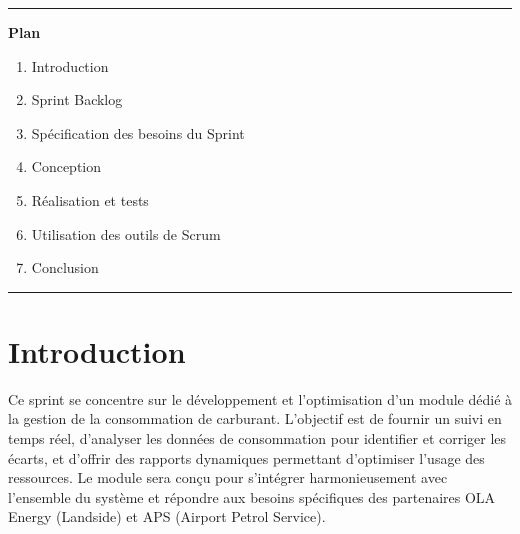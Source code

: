 \documentclass[a4paper,11pt]{report}
\begin{document}
\vspace{1.5cm}
\begin{center}
  \color{blue!60!black}\rule{0.6\textwidth}{1pt}
\end{center}
\vspace{1.5cm}

\begin{center}
  {\huge\bfseries Plan}\\[0.5em]
\end{center}
\vspace{1em}

\begin{enumerate}[%
  label=\bfseries\Large\arabic*., 
  leftmargin=2cm, 
  itemsep=1em
]
   \item Introduction
  \item Sprint Backlog
  \item Spécification des besoins du Sprint
  \item Conception
  \item Réalisation et tests
  \item Utilisation des outils de Scrum
  \item Conclusion
\end{enumerate}

\vfill
\begin{center}
  \color{blue!60!black}\rule{0.6\textwidth}{0.8pt}
\end{center}

\newpage
\setcounter{section}{0}

\section{Introduction}

Ce sprint se concentre sur le développement et l’optimisation d’un module dédié à la gestion de la consommation de carburant. L’objectif est de fournir un suivi en temps réel, d’analyser les données de consommation pour identifier et corriger les écarts, et d’offrir des rapports dynamiques permettant d’optimiser l’usage des ressources. Le module sera conçu pour s’intégrer harmonieusement avec l’ensemble du système et répondre aux besoins spécifiques des partenaires OLA Energy (Landside) et APS (Airport Petrol Service).
\end{document}
